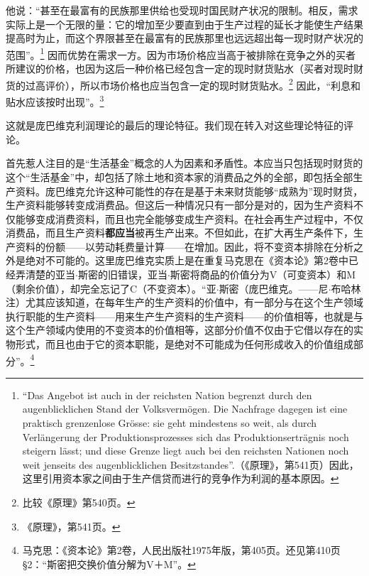 \documentclass[fontset=fandol, a4paper, 12pt, openright]{ctexbook}
\begin{document}
他说：“甚至在最富有的民族那里供给也受现时国民财产状况的限制。相反，需求实际上是一个无限的量：它的增加至少要直到由于生产过程的延长才能使生产结果提高时为止，而这个界限甚至在最富有的民族那里也远远超出每一现时财产状况的范围”。\footnote{``Das Angebot ist auch in der reichsten Nation begrenzt durch den augenblicklichen Stand der Volksverm\"{o}gen. Die Nachfrage dagegen ist eine praktisch grenzenlose Gr\"{o}sse: sie geht mindestens so weit, als durch Verl\"{a}ngerung der Produktionsprozesses sich das Produktionsertr\"{a}gnis noch steigern l\"{a}sst; und diese Grenze liegt auch bei den reichsten Nationen noch weit jenseits des augenblicklichen Besitzstandes''.（《原理》，第541页）因此，这里引用资本家之间由于生产信贷而进行的竞争作为利润的基本原因。} 因而优势在需求一方。因为市场价格应当高于被排除在竞争之外的买者所建议的价格，也因为这后一种价格已经包含一定的现时财货贴水（买者对现时财货的过高评价），所以市场价格也应当包含一定的现时财货贴水。\footnote{比较《原理》第540页。} 因此，“利息和贴水应该按时出现”。\footnote{《原理》，第541页。}

这就是庞巴维克利润理论的最后的理论特征。我们现在转入对这些理论特征的评论。

首先惹人注目的是“生活基金”概念的人为因素和矛盾性。本应当只包括现时财货的这个“生活基金”中，却包括了除土地和资本家的消费品之外的全部，即包括全部生产资料。庞巴维克允许这种可能性的存在是基于未来财货能够“成熟为”现时财货，生产资料能够转变成消费品。但这后一种情况只有一部分是对的，因为生产资料不仅能够变成消费资料，而且也完全能够变成生产资料。在社会再生产过程中，不仅消费品，而且生产资料\textbf{都应当}被再生产出来。不但如此，在扩大再生产条件下，生产资料的份额——以劳动耗费量计算——在增加。因此，将不变资本排除在分析之外是绝对不可能的。这里庞巴维克实质上是在重复马克思在《资本论》第2卷中已经弄清楚的亚当$\cdot$斯密的旧错误，亚当$\cdot$斯密将商品的价值分为V（可变资本）和M（剩余价值），却完全忘记了C（不变资本）。“亚$\cdot$斯密（庞巴维克。——尼$\cdot$布哈林注）尤其应该知道，在每年生产的生产资料的价值中，有一部分与在这个生产领域执行职能的生产资料——用来生产生产资料的生产资料——的价值相等，也就是与这个生产领域内使用的不变资本的价值相等，这部分价值不仅由于它借以存在的实物形式，而且也由于它的资本职能，是绝对不可能成为任何形成收入的价值组成部分”。\footnote{马克思：《资本论》第2卷，人民出版社1975年版，第405页。还见第410页§2：“斯密把交换价值分解为V＋M”。}
\end{document}
